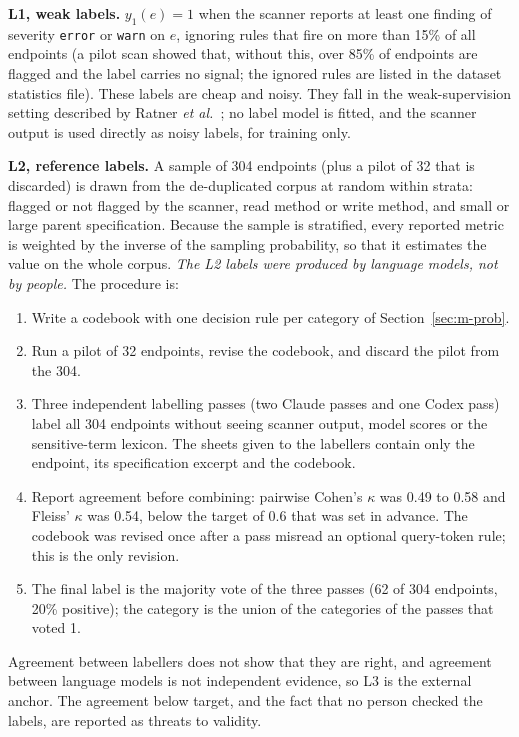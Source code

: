 \documentclass[conference]{IEEEtran}
\begin{document}
\textbf{L1, weak labels.} $y_1(e)=1$ when the scanner reports at least one finding of
severity \texttt{error} or \texttt{warn} on $e$, ignoring rules that fire on more than 15\% of all
endpoints (a pilot scan showed that, without this, over 85\% of endpoints are flagged and the label carries no signal;
the ignored rules are listed in the dataset statistics file). These labels are cheap and noisy.
They fall in the weak-supervision setting described by Ratner \emph{et al.}~\cite{snorkel};
no label model is fitted, and the scanner output is used directly as noisy labels, for
training only.

\textbf{L2, reference labels.} A sample of 304 endpoints (plus a pilot of 32 that is
discarded) is drawn from the de-duplicated corpus at random within strata: flagged or not
flagged by the scanner, read method or write method, and small or large parent specification.
Because the sample is stratified, every reported metric is weighted by the inverse of the
sampling probability, so that it estimates the value on the whole corpus. \emph{The L2 labels
were produced by language models, not by people.} The procedure is:
\begin{enumerate}
\item Write a codebook with one decision rule per category of Section~\ref{sec:m-prob}.
\item Run a pilot of 32 endpoints, revise the codebook, and discard the pilot from the 304.
\item Three independent labelling passes (two Claude passes and one Codex pass) label all 304
endpoints without seeing scanner output, model scores or the sensitive-term lexicon. The
sheets given to the labellers contain only the endpoint, its specification excerpt and the codebook.
\item Report agreement before combining: pairwise Cohen's $\kappa$ was 0.49 to 0.58 and
Fleiss' $\kappa$ was 0.54, below the target of 0.6 that was set in advance. The codebook was
revised once after a pass misread an optional query-token rule; this is the only revision.
\item The final label is the majority vote of the three passes (62 of 304 endpoints, 20\%
positive); the category is the union of the categories of the passes that voted 1.
\end{enumerate}
Agreement between labellers does not show that they are right, and agreement between language
models is not independent evidence, so L3 is the external anchor. The agreement below target,
and the fact that no person checked the labels, are reported as threats to validity.
\end{document}
